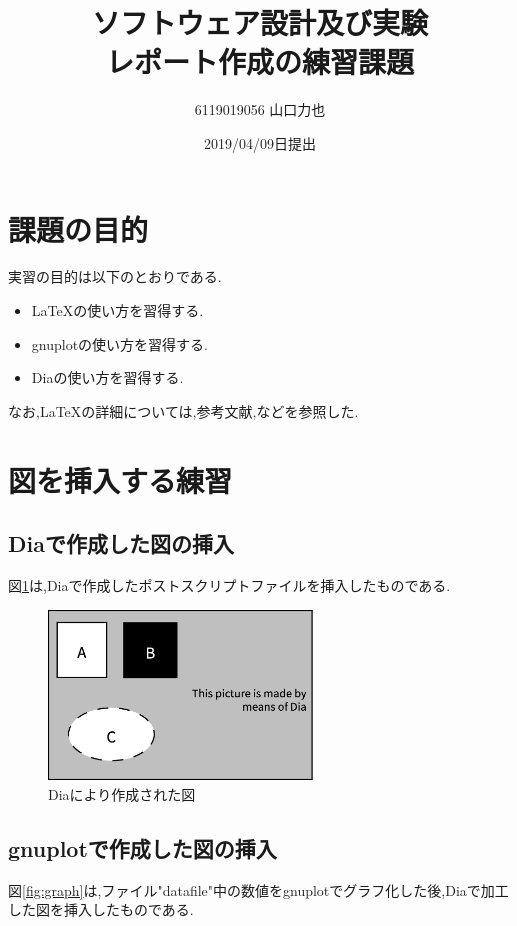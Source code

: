 \documentclass{jarticle}
\title{ソフトウェア設計及び実験\\レポート作成の練習課題}
\author{6119019056 山口力也}
\date{2019/04/09日提出}
\begin{document}
\maketitle

\section{課題の目的}
実習の目的は以下のとおりである.\\
\begin{itemize}

\item \LaTeX の使い方を習得する.
\item gnuplotの使い方を習得する.
\item Diaの使い方を習得する.

\end{itemize}
なお,\LaTeX の詳細については,参考文献\cite{okumura},\cite{matsuda}などを参照した.


\section{図を挿入する練習}
\subsection{Diaで作成した図の挿入}
図\ref{fig:dia}は,Diaで作成したポストスクリプトファイルを挿入したものである.


\begin{figure}
\begin{center}
\includegraphics[width=7.0cm]{dia.eps}
\caption{Diaにより作成された図}
\label{fig:dia}
\end{center}
\end{figure}

\subsection{gnuplotで作成した図の挿入}
図\ref{fig:graph}は,ファイル"datafile"中の数値をgnuplotでグラフ化した後,Diaで加工した図を挿入したものである.
\end{document}
